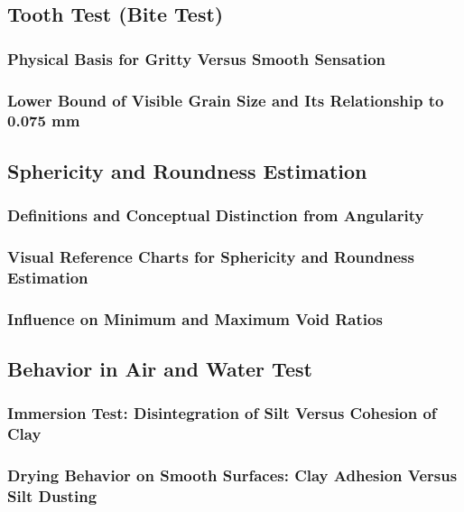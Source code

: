 \subsection{Tooth Test (Bite Test)}

\subsubsection{Physical Basis for Gritty Versus Smooth Sensation}

\subsubsection{Lower Bound of Visible Grain Size and Its Relationship to 0.075 mm}

\subsection{Sphericity and Roundness Estimation}

\subsubsection{Definitions and Conceptual Distinction from Angularity}

\subsubsection{Visual Reference Charts for Sphericity and Roundness Estimation}

\subsubsection{Influence on Minimum and Maximum Void Ratios}

\subsection{Behavior in Air and Water Test}

\subsubsection{Immersion Test: Disintegration of Silt Versus Cohesion of Clay}

\subsubsection{Drying Behavior on Smooth Surfaces: Clay Adhesion Versus Silt Dusting}

